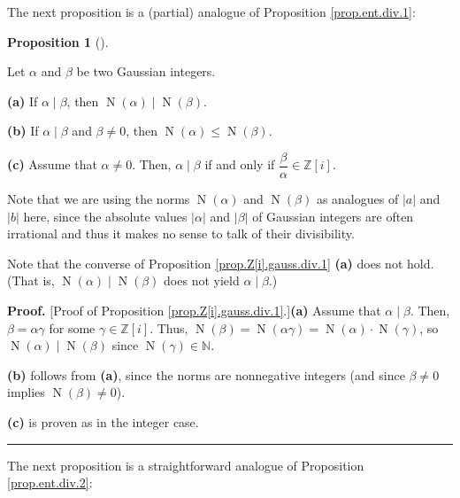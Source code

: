 \documentclass[numbers=enddot,12pt,final,onecolumn,notitlepage]{scrartcl}%
\numberwithin{exer}{subsection}
\theoremstyle{definition}
\newtheorem{prop}[theo]{Proposition}
\newenvironment{proposition}[1][]
{\begin{prop}[#1]\begin{leftbar}}
{\end{leftbar}\end{prop}}
\newenvironment{proof}[1][Proof]{\noindent\textbf{#1.} }{\ \rule{0.5em}{0.5em}}
\begin{document}
The next proposition is a (partial) analogue of Proposition
\ref{prop.ent.div.1}:

\begin{proposition}
\label{prop.Z[i].gauss.div.1}Let $\alpha$ and $\beta$ be two Gaussian integers.

\textbf{(a)} If $\alpha\mid\beta$, then $\operatorname*{N}\left(
\alpha\right)  \mid\operatorname*{N}\left(  \beta\right)  $.

\textbf{(b)} If $\alpha\mid\beta$ and $\beta\neq0$, then $\operatorname*{N}%
\left(  \alpha\right)  \leq\operatorname*{N}\left(  \beta\right)  $.

\textbf{(c)} Assume that $\alpha\neq0$. Then, $\alpha\mid\beta$ if and only if
$\dfrac{\beta}{\alpha}\in\mathbb{Z}\left[  i\right]  $.
\end{proposition}

Note that we are using the norms $\operatorname*{N}\left(  \alpha\right)  $
and $\operatorname*{N}\left(  \beta\right)  $ as analogues of $\left\vert
a\right\vert $ and $\left\vert b\right\vert $ here, since the absolute values
$\left\vert \alpha\right\vert $ and $\left\vert \beta\right\vert $ of Gaussian
integers are often irrational and thus it makes no sense to talk of their divisibility.

Note that the converse of Proposition \ref{prop.Z[i].gauss.div.1} \textbf{(a)}
does not hold. (That is, $\operatorname*{N}\left(  \alpha\right)
\mid\operatorname*{N}\left(  \beta\right)  $ does not yield $\alpha\mid\beta$.)

\begin{proof}
[Proof of Proposition \ref{prop.Z[i].gauss.div.1}.]\textbf{(a)} Assume that
$\alpha\mid\beta$. Then, $\beta=\alpha\gamma$ for some $\gamma\in
\mathbb{Z}\left[  i\right]  $. Thus, $\operatorname*{N}\left(  \beta\right)
=\operatorname*{N}\left(  \alpha\gamma\right)  =\operatorname*{N}\left(
\alpha\right)  \cdot\operatorname*{N}\left(  \gamma\right)  $, so
$\operatorname*{N}\left(  \alpha\right)  \mid\operatorname*{N}\left(
\beta\right)  $ since $\operatorname*{N}\left(  \gamma\right)  \in\mathbb{N}$.

\textbf{(b)} follows from \textbf{(a)}, since the norms are nonnegative
integers (and since $\beta\neq0$ implies $\operatorname*{N}\left(
\beta\right)  \neq0$).

\textbf{(c)} is proven as in the integer case.
\end{proof}

The next proposition is a straightforward analogue of Proposition
\ref{prop.ent.div.2}:
\end{document}
